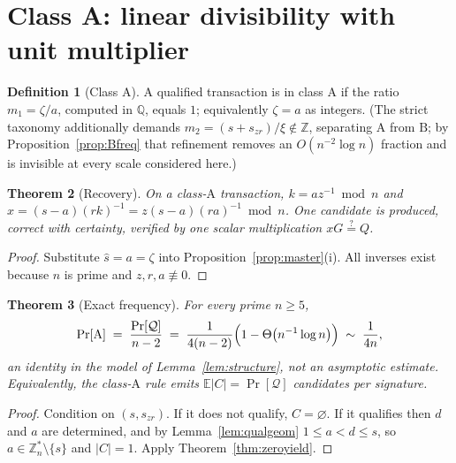 \documentclass[11pt,a4paper]{article}
\theoremstyle{plain}
\newtheorem{theorem}{Theorem}
\theoremstyle{definition}
\newtheorem{definition}[theorem]{Definition}
\theoremstyle{remark}
\newcommand{\Zs}{\mathbb{Z}_n^{*}}
\newcommand{\Zz}{\mathbb{Z}}
\newcommand{\Qu}{\mathcal{Q}}
\newcommand{\Ex}{\mathbb{E}}
\newcommand{\Pro}{\Pr}
\newcommand{\szr}{s_{zr}}
\newcommand{\clA}{\mathrm{A}}
\newcommand{\clB}{\mathrm{B}}
\begin{document}
\section{Class A: linear divisibility with unit multiplier}\label{sec:A}

\begin{definition}[Class $\clA$]\label{def:A}
A qualified transaction is in class $\clA$ if the ratio $m_1 = \zeta/a$, computed in $\mathbb{Q}$,
equals $1$; equivalently $\zeta = a$ as integers. (The strict taxonomy additionally demands
$m_2 = (s+\szr)/\xi \notin \Zz$, separating $\clA$ from $\clB$; by
Proposition~\ref{prop:Bfreq} that refinement removes an $O(n^{-2}\log n)$ fraction and is
invisible at every scale considered here.)
\end{definition}

\begin{theorem}[Recovery]\label{thm:Arec}
On a class-$\clA$ transaction, $k = az^{-1}\bmod n$ and
$x = (s-a)(rk)^{-1} = z(s-a)(ra)^{-1} \bmod n$. One candidate is produced, correct with certainty,
verified by one scalar multiplication $xG \stackrel{?}{=} Q$.
\end{theorem}

\begin{proof}
Substitute $\hat s = a = \zeta$ into Proposition~\ref{prop:master}(i). All inverses exist because
$n$ is prime and $z,r,a \not\equiv 0$.
\end{proof}

\begin{theorem}[Exact frequency]\label{thm:Afreq}
For every prime $n \ge 5$,
\begin{equation}\label{eq:Afreq}
  \Pro[\clA] \;=\; \frac{\Pro[\Qu]}{n-2}
  \;=\; \frac{1}{4(n-2)}\Bigl(1 - \Theta\bigl(n^{-1}\log n\bigr)\Bigr) \;\sim\; \frac{1}{4n},
\end{equation}
an identity in the model of Lemma~\ref{lem:structure}, not an asymptotic estimate. Equivalently,
the class-$\clA$ rule emits $\Ex|C| = \Pro[\Qu]$ candidates per signature.
\end{theorem}

\begin{proof}
Condition on $(s,\szr)$. If it does not qualify, $C = \varnothing$. If it qualifies then $d$ and
$a$ are determined, and by Lemma~\ref{lem:qualgeom} $1 \le a < d \le s$, so
$a \in \Zs\setminus\{s\}$ and $|C| = 1$. Apply Theorem~\ref{thm:zeroyield}.
\end{proof}
\end{document}
